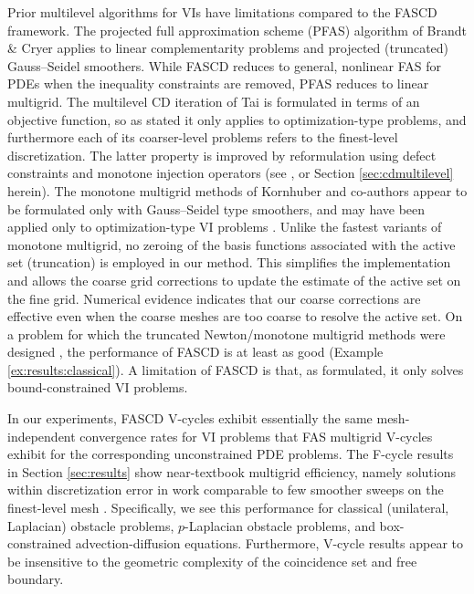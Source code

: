 \documentclass[review,hidelinks,onefignum,onetabnum]{siamart220329}
\begin{document}
Prior multilevel algorithms for VIs have limitations compared to the FASCD framework.  The projected full approximation scheme (PFAS) algorithm of Brandt \& Cryer \cite{BrandtCryer1983} applies to linear complementarity problems and projected (truncated) Gauss--Seidel smoothers.  While FASCD reduces to general, nonlinear FAS for PDEs when the inequality constraints are removed, PFAS reduces to linear multigrid.  The multilevel CD iteration of Tai \cite{Tai2003} is formulated in terms of an objective function, so as stated it only applies to optimization-type problems, and furthermore each of its coarser-level problems refers to the finest-level discretization.  The latter property is improved by reformulation using defect constraints and monotone injection operators (see \cite[Algorithm 4.7]{GraeserKornhuber2009}, or Section \ref{sec:cdmultilevel} herein).  The monotone multigrid methods of Kornhuber and co-authors \cite{GraeserKornhuber2009,Kornhuber1994} appear to be formulated only with Gauss--Seidel type smoothers, and may have been applied only to optimization-type VI problems \cite[for example]{JouvetGraeser2013}.  Unlike the fastest variants of monotone multigrid, no zeroing of the basis functions associated with the active set (truncation) is employed in our method.  This simplifies the implementation and allows the coarse grid corrections to update the estimate of the active set on the fine grid.  Numerical evidence indicates that our coarse corrections are effective even when the coarse meshes are too coarse to resolve the active set.  On a problem for which the truncated Newton/monotone multigrid methods were designed \cite[problem 7.1.1]{GraeserKornhuber2009}, the performance of FASCD is at least as good (Example \ref{ex:results:classical}).  A limitation of FASCD is that, as formulated, it only solves bound-constrained VI problems.

In our experiments, FASCD V-cycles exhibit essentially the same mesh-independent convergence rates for VI problems that FAS multigrid V-cycles exhibit for the corresponding unconstrained PDE problems.  The F-cycle results in Section \ref{sec:results} show near-textbook multigrid efficiency, namely solutions within discretization error in work comparable to few smoother sweeps on the finest-level mesh \cite{BrandtLivne2011}.  Specifically, we see this performance for classical (unilateral, Laplacian) obstacle problems, $p$-Laplacian obstacle problems, and box-constrained advection-diffusion equations.  Furthermore, V-cycle results appear to be insensitive to the geometric complexity of the coincidence set and free boundary.
\end{document}
